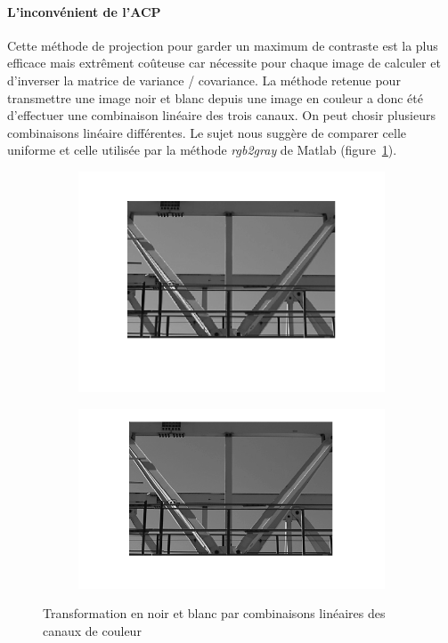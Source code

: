 \documentclass{article}
\begin{document}
\paragraph{L'inconvénient de l'ACP}
Cette méthode de projection pour garder un maximum de contraste est la plus efficace mais extrêment coûteuse car nécessite pour chaque image de calculer et d'inverser la matrice de variance / covariance. La méthode retenue pour transmettre une image noir et blanc depuis une image en couleur a donc été d'effectuer une combinaison linéaire des trois canaux. On peut chosir plusieurs combinaisons linéaire différentes. Le sujet nous suggère de comparer celle uniforme et celle utilisée par la méthode \emph{rgb2gray} de Matlab (figure~\ref{combinaisons_canaux}).
\begin{figure}[!ht]
    \centering
    \begin{subfigure}[c]{0.45\linewidth}
        \centering
        \includegraphics[width=\linewidth]{images/1-uniform.png}
    \end{subfigure}
    \hfill
    \begin{subfigure}[c]{0.45\linewidth}
        \centering
        \includegraphics[width=\linewidth]{images/1-rgb2gray.png}
    \end{subfigure}
    \caption{Transformation en noir et blanc par combinaisons linéaires des canaux de couleur}
    \label{combinaisons_canaux}
\end{figure}
\end{document}
